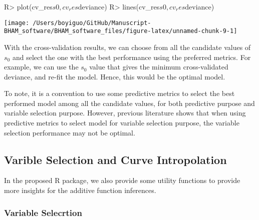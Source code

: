 \documentclass[
]{jss}
\begin{document}
\begin{CodeChunk}
\begin{CodeInput}
R> plot(cv_res$s0, cv_res$deviance)
R> lines(cv_res$s0, cv_res$deviance)
\end{CodeInput}


\begin{center}\texttt{[image: /Users/boyiguo/GitHub/Manuscript-BHAM\_software/BHAM\_software\_files/figure-latex/unnamed-chunk-9-1]} \end{center}

\end{CodeChunk}

With the cross-validation results, we can choose from all the candidate
values of \(s_0\) and select the one with the best performance using the
preferred metrics. For example, we can use the \(s_0\) value that gives
the minimum cross-validated deviance, and re-fit the model. Hence, this
would be the optimal model.

\begin{CodeChunk}
\end{CodeChunk}

To note, it is a convention to use some predictive metrics to select the
best performed model among all the candidate values, for both predictive
purpose and variable selection purpose. However, previous literature
shows that when using predictive metrics to select model for variable
selection purpose, the variable selection performance may not be
optimal.

\subsection{Varible Selection and Curve Intropolation}

In the proposed R package, we also provide some utility functions to
provide more insights for the additive function inferences.

\subsubsection{Variable Selecrtion}
\end{document}
